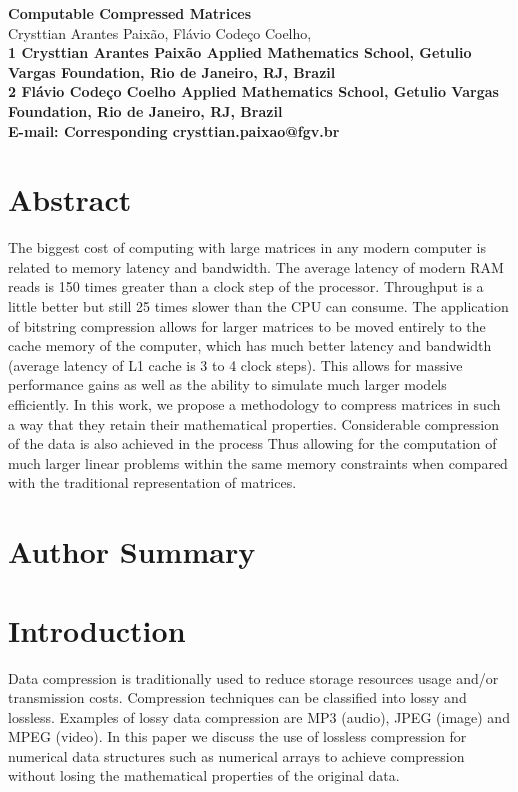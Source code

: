 \documentclass[10pt]{article}
\date{}
\begin{document}
\begin{flushleft}
{\Large
\textbf{Computable Compressed Matrices}
}
\\
Crysttian Arantes Paix\~{a}o, 
Fl\'{a}vio Code\c{c}o Coelho, 
\\
\bf{1} Crysttian Arantes Paix\~{a}o Applied Mathematics School, Getulio Vargas Foundation, Rio de Janeiro, RJ, Brazil
\\
\bf{2} Fl\'{a}vio Code\c{c}o Coelho Applied Mathematics School, Getulio Vargas Foundation, Rio de Janeiro, RJ, Brazil
\\
 E-mail: Corresponding crysttian.paixao@fgv.br
\end{flushleft}

\section*{Abstract}
The biggest cost of
computing with large matrices in any modern computer is related to memory
latency and bandwidth. The average latency of modern RAM reads is 150 times
greater than a clock step of the processor\cite{alted2010modern}. Throughput is
a little better but still 25 times slower than the CPU can consume. The
application of bitstring compression allows for larger matrices to be moved
entirely to the cache memory of the computer, which has much better latency and
bandwidth (average latency of L1 cache is 3 to 4 clock steps). This allows for
massive performance gains as well as the ability to simulate much larger models
efficiently. In this work, we propose a methodology to compress matrices in such
a way that they retain their mathematical properties. Considerable compression
of the data is also achieved in the process Thus allowing for the computation of
much larger linear problems within the same memory constraints when compared
with the traditional representation of matrices.
\section*{Author Summary}

\section*{Introduction}

Data compression is traditionally used to reduce storage resources usage and/or transmission costs\cite{salomon}. Compression techniques can be classified into lossy and lossless. Examples of lossy data compression are MP3 (audio), JPEG (image) and MPEG (video). In this paper we discuss the use of lossless compression for numerical data structures such as numerical arrays to achieve compression without losing the mathematical properties of the original data.  
\end{document}
